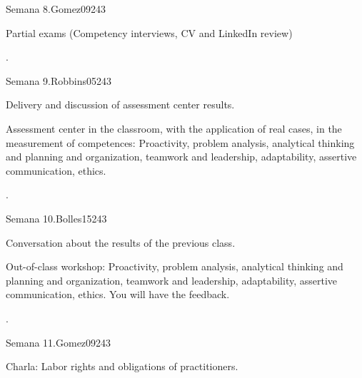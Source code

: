 \begin{syllabus}
\begin{unit}{Semana 8.}{Gomez09}{24}{3}
   \begin{topics}
      \item Partial exams (Competency interviews, CV and LinkedIn review)
   \end{topics}

   \begin{unitgoals}
      \item .
   \end{unitgoals}
\end{unit}

\begin{unit}{Semana 9.}{Robbins05}{24}{3}
   \begin{topics}
      \item Delivery and discussion of assessment center results.
      \item Assessment center in the classroom, with the application of real cases, in the measurement of competences: Proactivity, problem analysis, analytical thinking and planning and organization, teamwork and leadership, adaptability, assertive communication, ethics.
    \end{topics}

   \begin{unitgoals}
      \item .
   \end{unitgoals}
\end{unit}

\begin{unit}{Semana 10.}{Bolles15}{24}{3}
   \begin{topics}
      \item Conversation about the results of the previous class.
      \item Out-of-class workshop: Proactivity, problem analysis, analytical thinking and planning and organization, teamwork and leadership, adaptability, assertive communication, ethics. You will have the feedback.
   \end{topics}

   \begin{unitgoals}
      \item .
   \end{unitgoals}
\end{unit}

\begin{unit}{Semana 11.}{Gomez09}{24}{3}
   \begin{topics}
      \item Charla: Labor rights and obligations of practitioners.
   \end{topics}


\end{unit}
\end{syllabus}
